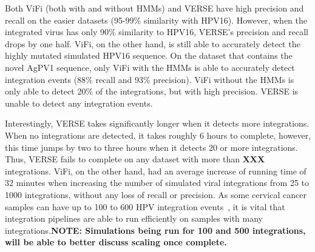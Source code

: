 \documentclass[10pt]{article}
\begin{document}
Both ViFi (both with and without HMMs) and VERSE have high precision and recall on the easier datasets (95-99\% similarity with HPV16).  However, when the integrated virus has only 90\% similarity to HPV16, VERSE's precision and recall drops by one half.  ViFi, on the other hand, is still able to accurately detect the highly mutated simulated HPV16 sequence.  On the dataset that contains the novel AgPV1 sequence, only ViFi with the HMMs is able to accurately detect integration events (88\% recall and 93\% precision).  ViFi without the HMMs is only able to detect 20\% of the integrations, but with high precision.  VERSE is unable to detect any integration events.  

Interestingly, VERSE takes significantly longer when it detects more integrations.  When no integrations are detected, it takes roughly 6 hours to complete, however, this time jumps by two to three hours when it detects 20 or more integrations.  Thus, VERSE fails to complete on any dataset with more than \textbf{XXX} integrations.  ViFi, on the other hand, had an average increase of running time of 32 minutes when increasing the number of simulated viral integrations from 25 to 1000 integrations, without any loss of recall or precision.  As some cervical cancer samples can have up to 100 to 600 HPV integration events~\cite{Hu2015}, it is vital that integration pipelines are able to run efficiently on samples with many integrations.\textbf{NOTE:  Simulations being run for 100 and 500 integrations, will be able to better discuss scaling once complete.}

\end{document}
